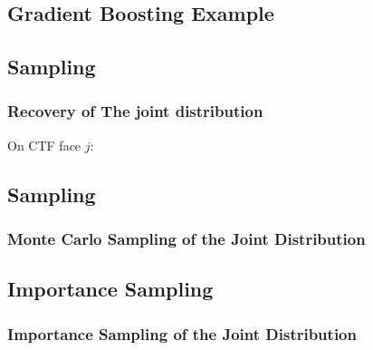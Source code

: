 \documentclass[t, pdftex]{beamer}
\begin{document}
\subsection*{Gradient Boosting Example}
\begin{frame}
\vspace{-16pt}

\end{frame}

\subsection*{Sampling}
\begin{frame}
\frametitle{Recovery of The joint distribution}
\vspace{-16pt}
On CTF face $j$:

\end{frame}

\subsection*{Sampling}
\begin{frame}
\frametitle{Monte Carlo Sampling of the Joint Distribution}
\vspace{-16pt}

\end{frame}

\subsection*{Importance Sampling}
\begin{frame}
\frametitle{Importance Sampling of the Joint Distribution}
\vspace{-16pt}

\end{frame}


\end{document}
